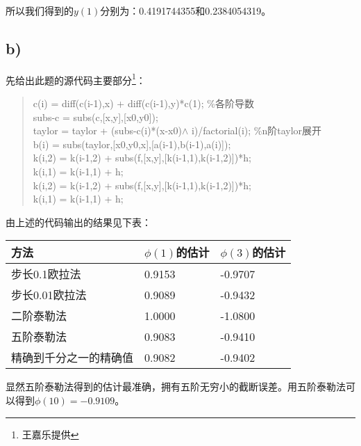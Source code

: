 \documentclass[a4paper,12pt]{article}
\begin{document}
\par
所以我们得到的$y(1)$分别为：0.4191744355和0.2384054319。
\subsection{b)}
先给出此题的源代码主要部分\footnote{王嘉乐提供}：
\begin{quote}
\small{
c(i) = diff(c(i-1),x) + diff(c(i-1),y)*c(1); \%各阶导数\\
subs-c = subs(c,[x,y],[x0,y0]);\\
taylor = taylor + (subs-c(i)*(x-x0)$\wedge$ i)/factorial(i);  \%n阶taylor展开\\
 b(i) = subs(taylor,[x0,y0,x],[a(i-1),b(i-1),a(i)]);\\
 k(i,2) = k(i-1,2) + subs(f,[x,y],[k(i-1,1),k(i-1,2)])*h;\\
    k(i,1) = k(i-1,1) + h;\\
    k(i,2) = k(i-1,2) + subs(f,[x,y],[k(i-1,1),k(i-1,2)])*h;\\
    k(i,1) = k(i-1,1) + h;\\
}
\end{quote}
由上述的代码输出的结果见下表：\\
\begin{center}
\begin{tabular}{|l|l|l|}
  \hline
  方法 & $\phi(1)$的估计 & $\phi(3)$的估计 \\
  \hline
  步长0.1欧拉法 & 0.9153 & -0.9707 \\
  步长0.01欧拉法 & 0.9089 & -0.9432 \\
  二阶泰勒法 & 1.0000 & -1.0800 \\
  五阶泰勒法 & 0.9083 & -0.9410  \\
  \hline
  精确到千分之一的精确值 & 0.9082 & -0.9402 \\
  \hline
\end{tabular}
\end{center}

\par
显然五阶泰勒法得到的估计最准确，拥有五阶无穷小的截断误差。用五阶泰勒法可以得到$\phi(10)=-0.9109$。
\end{document}
